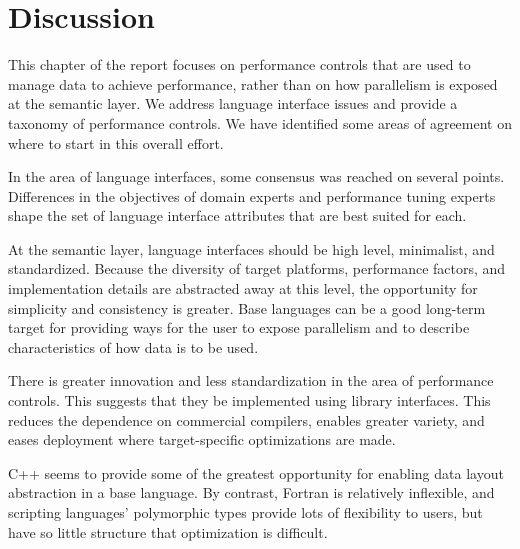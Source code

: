 

\section{Discussion}

This chapter of the report focuses on performance controls that are
used to manage data to achieve performance, rather than on how
parallelism is exposed at the semantic layer.  We address language
interface issues and provide a taxonomy of performance controls.
 We have identified some
areas of agreement on where to start in this overall effort.

In the area of language interfaces, some consensus was reached on
several points.  Differences in the objectives of domain experts and
performance tuning experts shape the set of language interface
attributes that are best suited for each.

At the semantic layer, language interfaces should be high level,
minimalist, and standardized.  Because the diversity of target
platforms, performance factors, and implementation details are
abstracted away at this level, the opportunity for simplicity and
consistency is greater.  Base languages can be a good long-term target
for providing ways for the user to expose parallelism and to describe
characteristics of how data is to be used.

There is greater innovation and less standardization in the area of
performance controls.  This suggests that they be implemented using
library interfaces.  This reduces the dependence on commercial
compilers, enables greater variety, and eases deployment where
target-specific optimizations are made.

C++ seems to provide some of the greatest opportunity for enabling
data layout abstraction in a base language.  By contrast, Fortran is
relatively inflexible, and scripting languages' polymorphic types
provide lots of flexibility to users, but have so little structure
that optimization is difficult.

